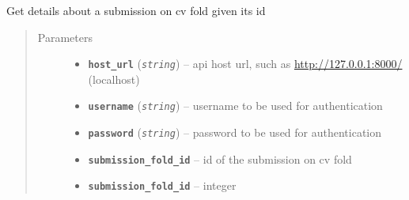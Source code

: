 \documentclass[letterpaper,10pt,english]{sphinxmanual}
\begin{document}
\begin{fulllineitems}
\label{modules/views:test_files.post_api.get_submission_fold_detail}
Get details about a submission on cv fold given its id
\begin{quote}\begin{description}
\item[{Parameters}] \leavevmode\begin{itemize}
\item {} 
\textbf{\texttt{host\_url}} (\emph{\texttt{string}}) -- api host url, such as \url{http://127.0.0.1:8000/} (localhost)

\item {} 
\textbf{\texttt{username}} (\emph{\texttt{string}}) -- username to be used for authentication

\item {} 
\textbf{\texttt{password}} (\emph{\texttt{string}}) -- password to be used for authentication

\item {} 
\textbf{\texttt{submission\_fold\_id}} -- id of the submission on cv fold

\item {} 
\textbf{\texttt{submission\_fold\_id}} -- integer

\end{itemize}

\end{description}\end{quote}

\end{fulllineitems}

\end{document}

